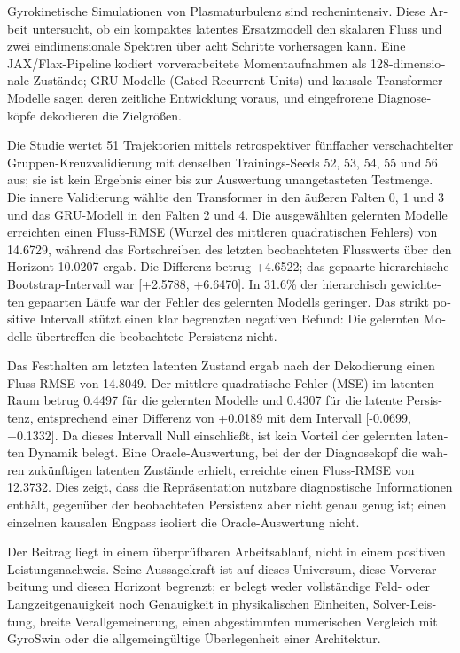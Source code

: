 \cleardoubleoddpage
\begin{otherlanguage}{ngerman}
\begin{abstract*}
Gyrokinetische Simulationen von Plasmaturbulenz sind rechenintensiv. Diese Arbeit untersucht,
ob ein kompaktes latentes Ersatzmodell den skalaren Fluss und zwei eindimensionale Spektren über
acht Schritte vorhersagen kann. Eine JAX/Flax-Pipeline kodiert vorverarbeitete Momentaufnahmen als
128-dimensionale Zustände; GRU-Modelle (Gated Recurrent Units) und kausale Transformer-Modelle sagen
deren zeitliche Entwicklung voraus, und eingefrorene Diagnoseköpfe dekodieren die Zielgrößen.

Die Studie wertet 51 Trajektorien mittels retrospektiver fünffacher verschachtelter
Gruppen-Kreuzvalidierung mit denselben Trainings-Seeds 52, 53, 54, 55 und 56 aus; sie ist kein
Ergebnis einer bis zur Auswertung unangetasteten Testmenge. Die innere Validierung wählte den
Transformer in den äußeren Falten 0, 1 und 3 und das GRU-Modell in den Falten 2 und 4. Die
ausgewählten gelernten Modelle erreichten einen Fluss-RMSE (Wurzel des mittleren quadratischen
Fehlers) von 14.6729, während das Fortschreiben des letzten beobachteten Flusswerts über den
Horizont 10.0207 ergab. Die Differenz betrug +4.6522; das gepaarte hierarchische Bootstrap-Intervall
war [+2.5788, +6.6470]. In 31.6\% der hierarchisch gewichteten gepaarten Läufe war der Fehler des
gelernten Modells geringer. Das strikt positive Intervall stützt einen klar begrenzten negativen
Befund: Die gelernten Modelle übertreffen die beobachtete Persistenz nicht.

Das Festhalten am letzten latenten Zustand ergab nach der Dekodierung einen Fluss-RMSE von
14.8049. Der mittlere quadratische Fehler (MSE) im latenten Raum betrug 0.4497 für die gelernten
Modelle und 0.4307 für die latente Persistenz, entsprechend einer Differenz von +0.0189 mit dem
Intervall [-0.0699, +0.1332]. Da dieses Intervall Null einschließt, ist kein Vorteil der gelernten
latenten Dynamik belegt. Eine Oracle-Auswertung, bei der der Diagnosekopf die wahren zukünftigen
latenten Zustände erhielt, erreichte einen Fluss-RMSE von 12.3732. Dies zeigt, dass die Repräsentation
nutzbare diagnostische Informationen enthält, gegenüber der beobachteten Persistenz aber nicht genau
genug ist; einen einzelnen kausalen Engpass isoliert die Oracle-Auswertung nicht.

Der Beitrag liegt in einem überprüfbaren Arbeitsablauf, nicht in einem positiven Leistungsnachweis.
Seine Aussagekraft ist auf dieses Universum, diese Vorverarbeitung und diesen Horizont begrenzt; er
belegt weder vollständige Feld- oder Langzeitgenauigkeit noch Genauigkeit in physikalischen
Einheiten, Solver-Leistung, breite Verallgemeinerung, einen abgestimmten numerischen Vergleich mit
GyroSwin oder die allgemeingültige Überlegenheit einer Architektur.
\end{abstract*}
\end{otherlanguage}
